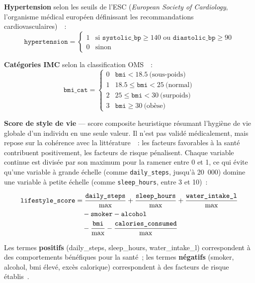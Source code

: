\textbf{Hypertension} selon les seuils de l'ESC (\textit{European Society of Cardiology}, l'organisme médical européen définissant les recommandations cardiovasculaires)~\cite{esc2018}~:
\begin{equation}
\texttt{hypertension} = \begin{cases} 1 & \text{si } \texttt{systolic\_bp} \geq 140 \text{ ou } \texttt{diastolic\_bp} \geq 90 \\ 0 & \text{sinon} \end{cases}
\end{equation}

\textbf{Catégories IMC} selon la classification OMS~\cite{who2000}~:
\begin{equation}
\texttt{bmi\_cat} = \begin{cases} 0 & \texttt{bmi} < 18.5\ \text{(sous-poids)} \\ 1 & 18.5 \leq \texttt{bmi} < 25\ \text{(normal)} \\ 2 & 25 \leq \texttt{bmi} < 30\ \text{(surpoids)} \\ 3 & \texttt{bmi} \geq 30\ \text{(obèse)} \end{cases}
\end{equation}

\textbf{Score de style de vie} --- score composite heuristique résumant l'hygiène de vie globale d'un individu en une seule valeur. Il n'est pas validé médicalement, mais repose sur la cohérence avec la littérature~\cite{booth2012}~: les facteurs favorables à la santé contribuent positivement, les facteurs de risque pénalisent. Chaque variable continue est divisée par son maximum pour la ramener entre 0 et 1, ce qui évite qu'une variable à grande échelle (comme \texttt{daily\_steps}, jusqu'à 20~000) domine une variable à petite échelle (comme \texttt{sleep\_hours}, entre 3 et 10)~:

\begin{align}
\texttt{lifestyle\_score} &= \frac{\texttt{daily\_steps}}{\max} + \frac{\texttt{sleep\_hours}}{\max} + \frac{\texttt{water\_intake\_l}}{\max} \notag \\
&\quad - \texttt{smoker} - \texttt{alcohol} \notag \\
&\quad - \frac{\texttt{bmi}}{\max} - \frac{\texttt{calories\_consumed}}{\max}
\end{align}

Les termes \textbf{positifs} (daily\_steps, sleep\_hours, water\_intake\_l) correspondent à des comportements bénéfiques pour la santé~; les termes \textbf{négatifs} (smoker, alcohol, bmi élevé, excès calorique) correspondent à des facteurs de risque établis~\cite{booth2012}.

